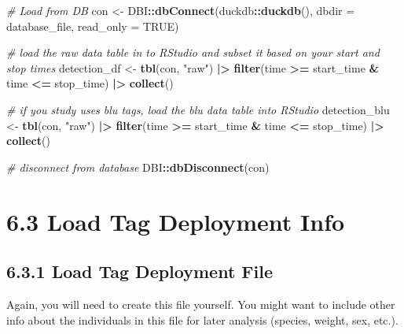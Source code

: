 \documentclass[
]{book}
\newenvironment{Shaded}{\begin{snugshade}}{\end{snugshade}}
\newcommand{\AttributeTok}[1]{\textcolor[rgb]{0.13,0.29,0.53}{#1}}
\newcommand{\CommentTok}[1]{\textcolor[rgb]{0.56,0.35,0.01}{\textit{#1}}}
\newcommand{\ConstantTok}[1]{\textcolor[rgb]{0.56,0.35,0.01}{#1}}
\newcommand{\FunctionTok}[1]{\textcolor[rgb]{0.13,0.29,0.53}{\textbf{#1}}}
\newcommand{\NormalTok}[1]{#1}
\newcommand{\OtherTok}[1]{\textcolor[rgb]{0.56,0.35,0.01}{#1}}
\newcommand{\SpecialCharTok}[1]{\textcolor[rgb]{0.81,0.36,0.00}{\textbf{#1}}}
\newcommand{\StringTok}[1]{\textcolor[rgb]{0.31,0.60,0.02}{#1}}
\begin{document}
\begin{Shaded}
\begin{Highlighting}[]
\CommentTok{\# Load from DB}
\NormalTok{con }\OtherTok{\textless{}{-}}\NormalTok{ DBI}\SpecialCharTok{::}\FunctionTok{dbConnect}\NormalTok{(duckdb}\SpecialCharTok{::}\FunctionTok{duckdb}\NormalTok{(), }
                      \AttributeTok{dbdir =}\NormalTok{ database\_file, }
                      \AttributeTok{read\_only =} \ConstantTok{TRUE}\NormalTok{)}

\CommentTok{\# load the raw data table in to RStudio and subset it based on your start and stop times}
\NormalTok{detection\_df }\OtherTok{\textless{}{-}} \FunctionTok{tbl}\NormalTok{(con, }\StringTok{"raw"}\NormalTok{) }\SpecialCharTok{|\textgreater{}} 
  \FunctionTok{filter}\NormalTok{(time }\SpecialCharTok{\textgreater{}=}\NormalTok{ start\_time }\SpecialCharTok{\&}\NormalTok{ time }\SpecialCharTok{\textless{}=}\NormalTok{ stop\_time) }\SpecialCharTok{|\textgreater{}}
  \FunctionTok{collect}\NormalTok{()}

\CommentTok{\# if you study uses blu tags, load the blu data table into RStudio}
\NormalTok{detection\_blu }\OtherTok{\textless{}{-}} \FunctionTok{tbl}\NormalTok{(con, }\StringTok{"raw"}\NormalTok{) }\SpecialCharTok{|\textgreater{}} 
  \FunctionTok{filter}\NormalTok{(time }\SpecialCharTok{\textgreater{}=}\NormalTok{ start\_time }\SpecialCharTok{\&}\NormalTok{ time }\SpecialCharTok{\textless{}=}\NormalTok{ stop\_time) }\SpecialCharTok{|\textgreater{}}
  \FunctionTok{collect}\NormalTok{()}

\CommentTok{\# disconnect from database}
\NormalTok{DBI}\SpecialCharTok{::}\FunctionTok{dbDisconnect}\NormalTok{(con)}
\end{Highlighting}
\end{Shaded}

\section{6.3 Load Tag Deployment Info}\label{load-tag-deployment-info}

\subsection{6.3.1 Load Tag Deployment File}\label{load-tag-deployment-file}

Again, you will need to create this file yourself. You might want to include other info about the individuals in this file for later analysis (species, weight, sex, etc.).
\end{document}
